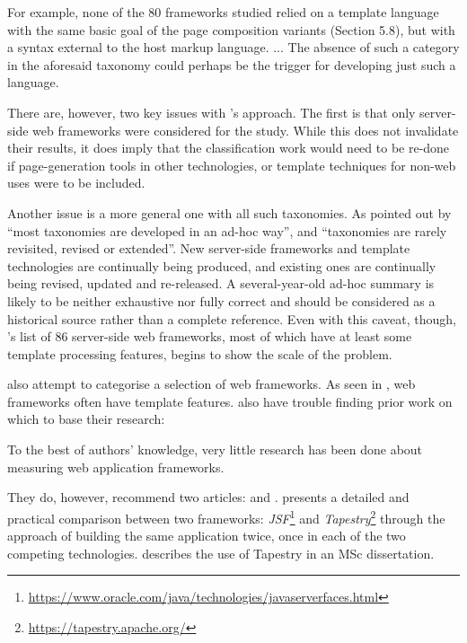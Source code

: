 \begin{displayquote}
For example, none of the 80 frameworks studied relied on a \gls{template language} with the same basic goal of the page composition variants (Section 5.8), but with a syntax external to the host markup language. ... The absence of such a category in the aforesaid taxonomy could perhaps be the trigger for developing just such a language. \citep{Vosloo2008}
\end{displayquote}

There are, however, two key issues with \citeauthor{Vosloo2008}'s approach. The first is that only server-side web frameworks were considered for the study. While this does not invalidate their results, it does imply that the classification work would need to be re-done if page-generation tools in other technologies, or template techniques for non-web uses were to be included.

Another issue is a more general one with all such taxonomies. As pointed out by \citet{Usman2017} \enquote{most taxonomies are developed in an ad-hoc way}, and \enquote{taxonomies are rarely revisited, revised or extended}. New server-side frameworks and template technologies are continually being produced, and existing ones are continually being revised, updated and re-released. A several-year-old ad-hoc summary is likely to be neither exhaustive nor fully correct and should be considered as a historical source rather than a complete reference. Even with this caveat, though, \citeauthor{Vosloo2008}'s list of 86 server-side web frameworks, most of which have at least some template processing features, begins to show the scale of the problem.

\citet{Laakso2008} also attempt to categorise a selection of web frameworks. As seen in \citet{Vosloo2008}, web frameworks often have template features. \citet{Laakso2008} also have trouble finding prior work on which to base their research:

\begin{displayquote}
To the best of authors' knowledge, very little research has been done about measuring web application frameworks. \citep{Laakso2008}
\end{displayquote}

They do, however, recommend two articles: \citet{Zoio2005} and \citet{Kolesnikov2006}. \citeauthor{Zoio2005} presents a detailed and practical comparison between two frameworks: \emph{JSF}\footnote{\url{https://www.oracle.com/java/technologies/javaserverfaces.html}} and \emph{Tapestry}\footnote{\url{https://tapestry.apache.org/}} through the approach of building the same application twice, once in each of the two competing technologies. \citeauthor{Kolesnikov2006} describes the use of Tapestry in an MSc dissertation.

